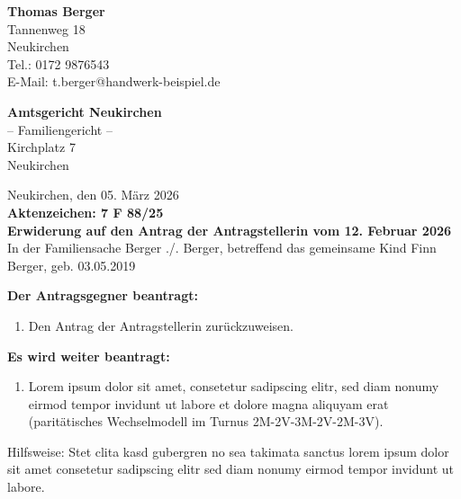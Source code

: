 \documentclass[
  11pt,
  a4paper,
]{article}
\providecommand{\tightlist}{%
  \setlength{\itemsep}{0pt}\setlength{\parskip}{0pt}}
\begin{document}
\noindent \textbf{Thomas Berger}\\[0mm]
\noindent Tannenweg 18\\[0mm]
 Neukirchen\\[0mm]
\noindent Tel.: 0172 9876543\\[0mm]
\noindent E-Mail: t.berger@handwerk-beispiel.de\par
\par\vspace{14pt}
\noindent \textbf{Amtsgericht Neukirchen}\\[0mm]
\noindent – Familiengericht –\\[0mm]
\noindent Kirchplatz 7\\[0mm]
 Neukirchen\par
\hfill Neukirchen, den 05. März 2026\\[1mm]
\noindent\textbf{Aktenzeichen: 7 F 88/25}\\[3mm]
\noindent\textbf{{Erwiderung auf den Antrag der Antragstellerin vom 12. Februar 2026}}\\[4mm]
\noindent In der Familiensache Berger ./. Berger, betreffend das gemeinsame Kind Finn Berger, geb. 03.05.2019\\[0mm]
\medskip

\textbf{Der Antragsgegner beantragt:}

\begin{enumerate}
\def\labelenumi{\arabic{enumi}.}
\tightlist
\item
  Den Antrag der Antragstellerin zurückzuweisen.
\end{enumerate}

\textbf{Es wird weiter beantragt:}

\begin{enumerate}
\def\labelenumi{\arabic{enumi}.}
\setcounter{enumi}{1}
\tightlist
\item
  Lorem ipsum dolor sit amet, consetetur sadipscing elitr, sed diam
  nonumy eirmod tempor invidunt ut labore et dolore magna aliquyam erat
  (paritätisches Wechselmodell im Turnus 2M-2V-3M-2V-2M-3V).
\end{enumerate}

Hilfsweise: Stet clita kasd gubergren no sea takimata sanctus lorem
ipsum dolor sit amet consetetur sadipscing elitr sed diam nonumy eirmod
tempor invidunt ut labore.
\end{document}
